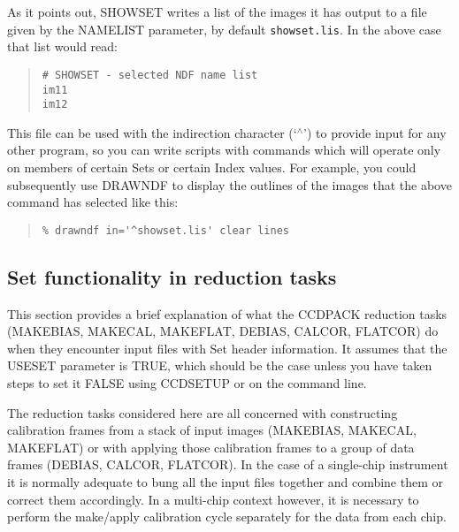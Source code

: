 \documentclass[twoside,11pt]{article}
\newcommand{\htmlref}[2]{#1}
\renewcommand{\_}{\texttt{\symbol{95}}}
\newenvironment{myquote}{\begin{quote}\begin{small}}{\end{small}\end{quote}}
\newcommand{\text}[1]{{\small \tt #1}}
\newcommand{\routine}[1]{{\sc #1}}
\newcommand{\xroutine}[1]{\htmlref{{\sc #1}}{#1}}
\begin{document}
As it points out, \routine{SHOWSET} writes a list of the images it
has output to a file given by the NAMELIST parameter, by default
\text{showset.lis}. 
In the above case that list would read:
\begin{myquote}
\begin{verbatim}
# SHOWSET - selected NDF name list
im11
im12
\end{verbatim}
\end{myquote}
This file can be used with the indirection character (`$^\wedge$')
to provide input for any other program, so you can write scripts
with commands which will operate only on members of certain Sets
or certain Index values.
For example, you could subsequently use \xroutine{DRAWNDF} to
display the outlines of the images that the above command has
selected like this:
\begin{myquote}
\begin{verbatim}
% drawndf in='^showset.lis' clear lines
\end{verbatim}
\end{myquote}


\subsection{Set functionality in reduction tasks}

This section provides a brief explanation of what the CCDPACK
reduction tasks 
(\xroutine{MAKEBIAS}, \xroutine{MAKECAL}, \xroutine{MAKEFLAT},
\xroutine{DEBIAS}, \xroutine{CALCOR}, \xroutine{FLATCOR})
do when they encounter input files with Set header information.
It assumes that the USESET parameter is TRUE, which should be the
case unless you have taken steps to set it FALSE using \xroutine{CCDSETUP}
or on the command line.

The reduction tasks considered here are all concerned with constructing
calibration frames from a stack of input images 
(\routine{MAKEBIAS}, \routine{MAKECAL}, \routine{MAKEFLAT})
or with applying those calibration frames to a group of data frames
(\routine{DEBIAS}, \routine{CALCOR}, \routine{FLATCOR}).
In the case of a single-chip instrument it is normally adequate to
bung all the input files together and combine them or correct them
accordingly.  In a multi-chip context however, it is necessary 
to perform the make/apply calibration cycle separately for 
the data from each chip.
\end{document}
